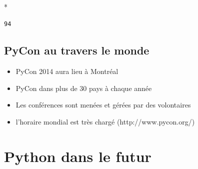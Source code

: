 \documentclass[letterpaper,10pt,english]{/Users/mlhamel/venv/apius/lib/python2.7/site-packages/sphinx/texinputs/sphinxhowto}
\def\smaller{\fontsize{9.5pt}{9.5pt}\selectfont}
\newenvironment{InvisibleVerbatim}
        {\begin{mdframed}[leftmargin=0.1\linewidth,innerleftmargin=3pt,innerrightmargin=3pt, userdefinedwidth=1\linewidth, linewidth=0pt, linecolor=white, usetwoside=false]}
        {\end{mdframed}}
\begin{document}
    

        
        

            
                \makebox[0.1\linewidth]{\smaller\hfill\tt\color{nbframe-out-prompt}Out\hspace{4pt}{[}5{]}:\hspace{4pt}}\\*
                \vspace{-2.55\baselineskip}\begin{InvisibleVerbatim}
                \vspace{-0.5\baselineskip}
\begin{alltt}94\end{alltt}

            \end{InvisibleVerbatim}
            
        
    
\subsection{PyCon au travers le monde}\label{pycon-au-travers-le-monde}

\begin{itemize}
\itemsep1pt\parskip0pt
\item
  PyCon 2014 aura lieu à Montréal
\item
  PyCon dans plus de 30 pays à chaque année
\item
  Les conférences sont menées et gérées par des volontaires
\item
  l'horaire mondial est très chargé (http://www.pycon.org/)
\end{itemize}\section{Python dans le futur}

\end{document}
